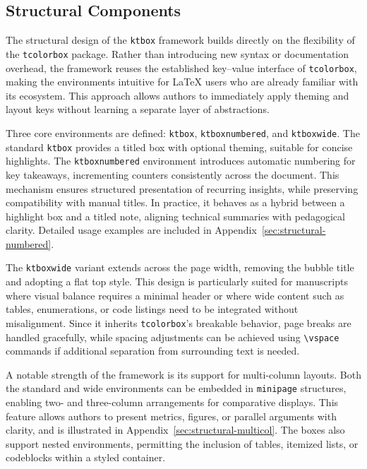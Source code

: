 \documentclass[12pt,onecolumn]{article}
\begin{document}
\subsection{Structural Components}
\label{sec:structural-components}
  The structural design of the \texttt{ktbox} framework builds directly on the flexibility of the \texttt{tcolorbox} package. Rather than introducing new syntax or documentation overhead, the framework reuses the established key–value interface of \texttt{tcolorbox}, making the environments intuitive for LaTeX users who are already familiar with its ecosystem. This approach allows authors to immediately apply theming and layout keys without learning a separate layer of abstractions.

  Three core environments are defined: \texttt{ktbox}, \texttt{ktboxnumbered}, and \texttt{ktboxwide}. The standard \texttt{ktbox} provides a titled box with optional theming, suitable for concise highlights. The \texttt{ktboxnumbered} environment introduces automatic numbering for key takeaways, incrementing counters consistently across the document. This mechanism ensures structured presentation of recurring insights, while preserving compatibility with manual titles. In practice, it behaves as a hybrid between a highlight box and a titled note, aligning technical summaries with pedagogical clarity. Detailed usage examples are included in Appendix~\ref{sec:structural-numbered}.

  The \texttt{ktboxwide} variant extends across the page width, removing the bubble title and adopting a flat top style. This design is particularly suited for manuscripts where visual balance requires a minimal header or where wide content such as tables, enumerations, or code listings need to be integrated without misalignment. Since it inherits \texttt{tcolorbox}’s breakable behavior, page breaks are handled gracefully, while spacing adjustments can be achieved using \verb|\vspace| commands if additional separation from surrounding text is needed.

  A notable strength of the framework is its support for multi-column layouts. Both the standard and wide environments can be embedded in \texttt{minipage} structures, enabling two- and three-column arrangements for comparative displays. This feature allows authors to present metrics, figures, or parallel arguments with clarity, and is illustrated in Appendix~\ref{sec:structural-multicol}. The boxes also support nested environments, permitting the inclusion of tables, itemized lists, or codeblocks within a styled container.
\end{document}
